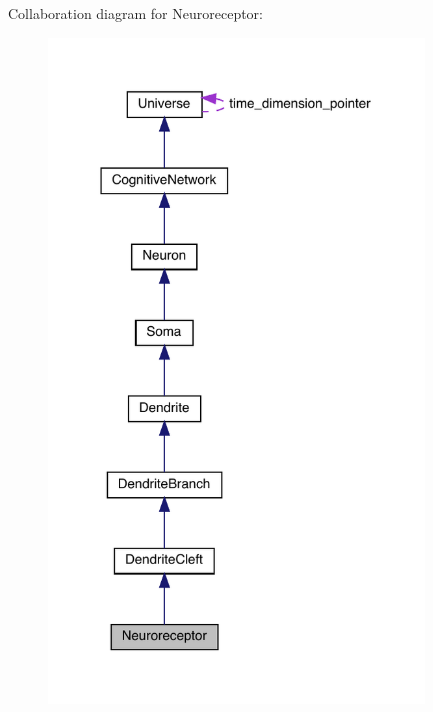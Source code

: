 Collaboration diagram for Neuroreceptor\+:\nopagebreak
\begin{figure}[H]
\begin{center}
\leavevmode
\includegraphics[width=283pt]{class_neuroreceptor__coll__graph}
\end{center}
\end{figure}
